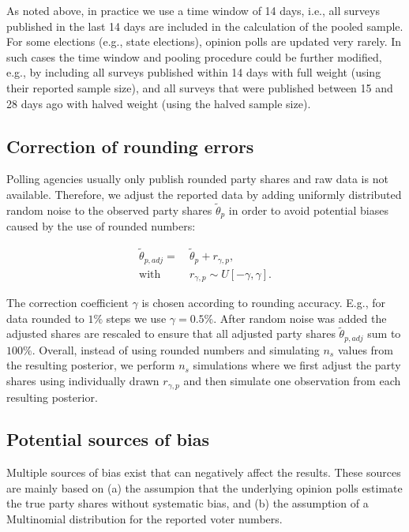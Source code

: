 \documentclass[smallextended]{svjour3}      %
\begin{document}
As noted above, in practice we use a time window of 14 days, i.e., all surveys
published in the last 14 days are included in the calculation of the pooled
sample. For some elections (e.g., state elections), opinion polls are
updated very rarely. In such cases the time window and pooling procedure
could be further modified, e.g., by including all surveys published within 14 days with full
weight (using their reported sample size), and all surveys that were published
between 15 and 28 days ago with halved weight (using the halved sample size).


\subsection{Correction of rounding errors}\label{ssec:rounding}
Polling agencies usually only publish rounded party shares and
raw data is not available. Therefore, we adjust the reported data by adding
uniformly distributed random noise to the observed party shares $\tilde{\theta}_p$ in order
to avoid potential biases caused by the use of rounded numbers:

\begin{equation}
\begin{aligned}
\tilde{\theta}_{p,adj} = \ &\tilde{\theta}_p + r_{\gamma,p}, \\
\text{with} \ \ \ \ \ &r_{\gamma,p} \sim U[-\gamma,\gamma].
\end{aligned}
\end{equation}

The correction coefficient $\gamma$ is chosen according to rounding accuracy.
E.g., for data rounded to $1\%$ steps we use $\gamma = 0.5\%$. After random noise
was added the adjusted shares are rescaled to ensure that all adjusted party shares
$\tilde{\theta}_{p,adj}$ sum to $100\%$. Overall, instead of using rounded numbers and simulating
$n_s$ values from the resulting posterior, we perform $n_s$ simulations where we
first adjust the party shares using individually drawn $r_{\gamma,p}$ and
then simulate one observation from each resulting posterior.


\subsection{Potential sources of bias}\label{ssec:bias}
Multiple sources of bias exist that can negatively affect the results.
These sources are mainly
based on (a) the assumpion that the underlying opinion polls estimate the
true party shares without systematic bias, and (b) the assumption of a
Multinomial distribution for the reported voter numbers.\\
\end{document}
